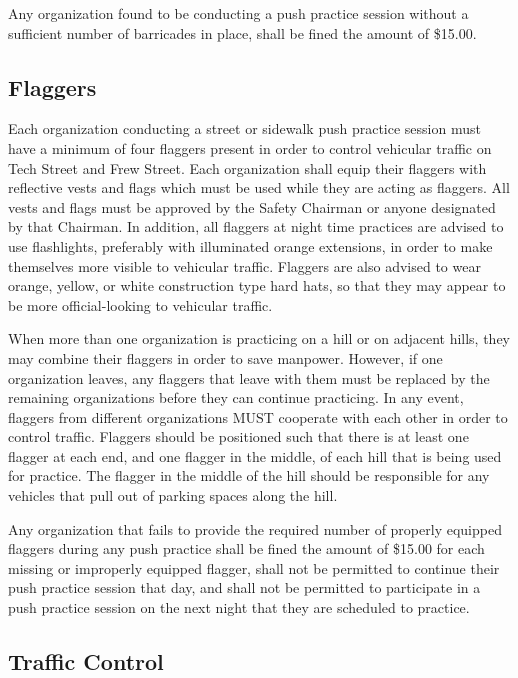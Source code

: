 	Any organization found to be conducting a push practice session without a
	sufficient number of barricades in place, shall be fined the amount of \$15.00.

\subsection{Flaggers}

	Each organization conducting a street or sidewalk push practice session must
	have a minimum of four flaggers present in order to control vehicular traffic
	on Tech Street and Frew Street. Each organization shall equip their flaggers
	with reflective vests and flags which must be used while they are acting as
	flaggers. All vests and flags must be approved by the Safety Chairman or anyone
	designated by that Chairman. In addition, all flaggers at night time practices
	are advised to use flashlights, preferably with illuminated orange extensions,
	in order to make themselves more visible to vehicular traffic. Flaggers are
	also advised to wear orange, yellow, or white construction type hard hats, so
	that they may appear to be more official-looking to vehicular traffic.

	When more than one organization is practicing on a hill or on adjacent hills,
	they may combine their flaggers in order to save manpower. However, if one
	organization leaves, any flaggers that leave with them must be replaced by the
	remaining organizations before they can continue practicing. In any event,
	flaggers from different organizations MUST cooperate with each other in order
	to control traffic. Flaggers should be positioned such that there is at least
	one flagger at each end, and one flagger in the middle, of each hill that is
	being used for practice. The flagger in the middle of the hill should be
	responsible for any vehicles that pull out of parking spaces along the hill.

	Any organization that fails to provide the required number of properly equipped
	flaggers during any push practice shall be fined the amount of \$15.00 for each
	missing or improperly equipped flagger, shall not be permitted to continue
	their push practice session that day, and shall not be permitted to participate
	in a push practice session on the next night that they are scheduled to
	practice.

\subsection{Traffic Control}


